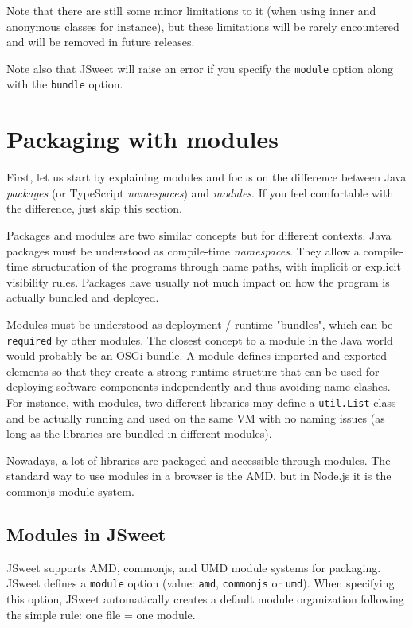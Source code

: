 \documentclass[a4paper]{report}
\begin{document}
Note that there are still some minor limitations to it (when using inner and anonymous classes for instance), but these limitations will be rarely encountered and will be removed in future releases.

Note also that JSweet will raise an error if you specify the \texttt{module} option along with the \texttt{bundle} option.

\section{Packaging with modules}

First, let us start by explaining modules and focus on the difference between Java \emph{packages} (or TypeScript \emph{namespaces}) and \emph{modules}. If you feel comfortable with the difference, just skip this section.

Packages and modules are two similar concepts but for different contexts. Java packages must be understood as compile-time \emph{namespaces}. They allow a compile-time structuration of the programs through name paths, with implicit or explicit visibility rules. Packages have usually not much impact on how the program is actually bundled and deployed.

Modules must be understood as deployment / runtime "bundles", which can be \texttt{required} by other modules. The closest concept to a module in the Java world would probably be an OSGi bundle. A module defines imported and exported elements so that they create a strong runtime structure that can be used for deploying software components independently and thus avoiding name clashes. For instance, with modules, two different libraries may define a \texttt{util.List} class and be actually running and used on the same VM with no naming issues (as long as the libraries are bundled in different modules).

Nowadays, a lot of libraries are packaged and accessible through modules. The standard way to use modules in a browser is the AMD, but in Node.js it is the commonjs module system.

\subsection{Modules in JSweet}

JSweet supports AMD, commonjs, and UMD module systems for packaging. JSweet defines a \texttt{module} option (value: \texttt{amd}, \texttt{commonjs} or \texttt{umd}). When specifying this option, JSweet automatically creates a default module organization following the simple rule: one file = one module. 
\end{document}
